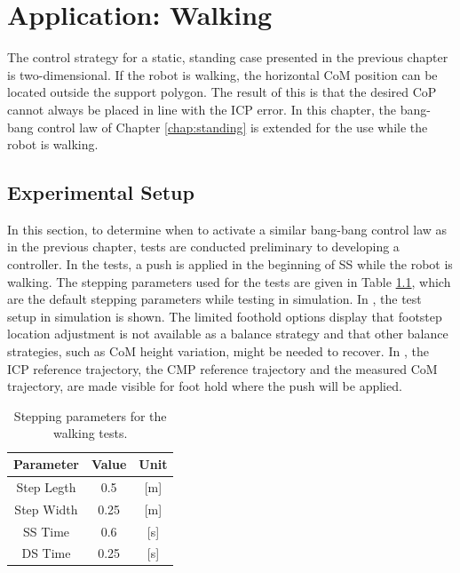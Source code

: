%
\chapter{Application: Walking}\label{chap:walking}
The control strategy for a static, standing case presented in the previous chapter is two-dimensional. If the robot is walking, the horizontal \ac{CoM} position can be located outside the support polygon. The result of this is that the desired \ac{CoP} cannot always be placed in line with the \ac{ICP} error.  In this chapter, the bang-bang control law of Chapter \ref{chap:standing} is extended for the use while the robot is walking.
\section{Experimental Setup}
In this section, to determine when to activate a similar bang-bang control law as in the previous chapter,  tests are conducted preliminary to developing a controller. In the tests, a push is applied in the beginning of \ac{SS} while the robot is walking. The stepping parameters used for the tests are given in Table \ref{tab:stepping}, which are the default stepping parameters while testing in simulation. In , the test setup in simulation is shown. The limited foothold options display that footstep location adjustment is not available as a balance strategy and that other balance strategies, such as \ac{CoM} height variation, might be needed to recover. In , the \ac{ICP} reference trajectory, the \ac{CMP} reference trajectory and the measured \ac{CoM} trajectory, are made visible for foot hold where the push will be applied. 
\begin{table}
\caption{Stepping parameters for the walking tests.} %
\centering %
\begin{tabular}{c c c } %
\hline\hline %
Parameter & Value & Unit \\
\hline %
Step Legth & 0.5 &  [m]\\
Step Width & 0.25 & [m]\\
\acs{SS} Time & 0.6 & [s]\\
\acs{DS} Time & 0.25 & [s]\\
\hline %
\end{tabular}
\label{tab:stepping} %
\end{table}
